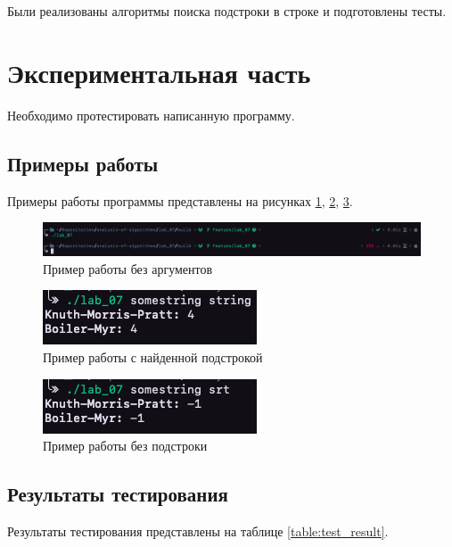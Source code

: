 \documentclass[a4paper,12pt]{article}
\begin{document}
Были реализованы алгоритмы поиска подстроки в строке и подготовлены тесты.

\newpage
\section{Экспериментальная часть}

Необходимо протестировать написанную программу.

\subsection{Примеры работы}

Примеры работы программы представлены на рисунках
\ref{img:zero_arg}, \ref{img:good}, \ref{img:not_found}.

\begin{figure}[H]
    \centering
    \includegraphics[scale=0.4]{zero_arg}
    \caption{Пример работы без аргументов}
    \label{img:zero_arg}
\end{figure}

\begin{figure}[H]
    \centering
    \includegraphics[scale=0.8]{good}
    \caption{Пример работы с найденной подстрокой}
    \label{img:good}
\end{figure}

\begin{figure}[H]
    \centering
    \includegraphics[scale=0.8]{not_found}
    \caption{Пример работы без подстроки}
    \label{img:not_found}
\end{figure}

\subsection{Результаты тестирования}

Результаты тестирования представлены на таблице \ref{table:test_result}.
\end{document}
